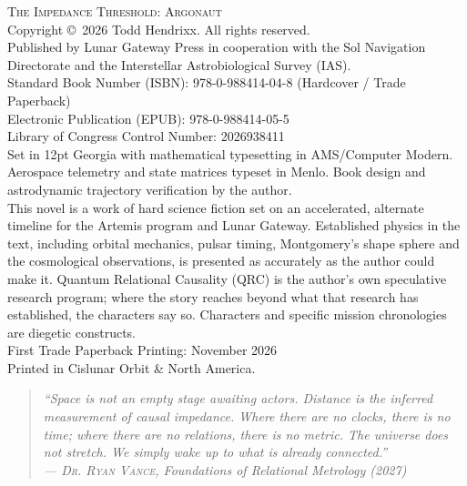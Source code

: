 \documentclass[12pt,twoside,openright]{book}
\begin{document}
\begin{flushleft}
\footnotesize
\setlength{\parindent}{0pt}
\setlength{\parskip}{0.8em}
\textsc{The Impedance Threshold: Argonaut}\\[0.5em]
Copyright \copyright\ 2026 Todd Hendrixx. All rights reserved.\\[0.8em]
Published by Lunar Gateway Press in cooperation with the Sol Navigation Directorate
and the Interstellar Astrobiological Survey (IAS).\\[0.8em]
Standard Book Number (ISBN): 978-0-988414-04-8 (Hardcover / Trade Paperback)\\
Electronic Publication (EPUB): 978-0-988414-05-5\\
Library of Congress Control Number: 2026938411\\[0.8em]
Set in 12pt Georgia with mathematical typesetting in AMS/Computer Modern.
Aerospace telemetry and state matrices typeset in Menlo.
Book design and astrodynamic trajectory verification by the author.\\[0.8em]
This novel is a work of hard science fiction set on an accelerated, alternate
timeline for the Artemis program and Lunar Gateway. Established physics in the text,
including orbital mechanics, pulsar timing, Montgomery's shape sphere and the
cosmological observations, is presented as accurately as the author could make it.
Quantum Relational Causality (QRC) is the author's own speculative research program;
where the story reaches beyond what that research has established, the characters say so.
Characters and specific mission chronologies are diegetic constructs.\\[0.8em]
First Trade Paperback Printing: November 2026\\[0.5em]
Printed in Cislunar Orbit \& North America.
\end{flushleft}
\clearpage

\vspace*{120pt}
\begin{quote}
\itshape
``Space is not an empty stage awaiting actors. Distance is the inferred measurement of causal impedance. Where there are no clocks, there is no time; where there are no relations, there is no metric. The universe does not stretch. We simply wake up to what is already connected.''\\[1.5em]
\hfill\upshape --- \textsc{Dr. Ryan Vance}, \emph{Foundations of Relational Metrology} (2027)
\end{quote}
\clearpage
\end{document}
